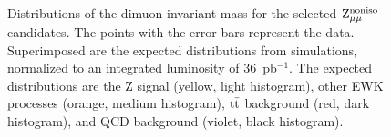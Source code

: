 \begin{figure}[hbtp]
    \begin{center}
     \begin{minipage}{73mm}
       \begin{center}
       \end{center}
     \end{minipage}
   \end{center}
\caption{Distributions of the dimuon invariant mass for the selected
$\mathrm{Z}_{\mu\mu}^{\mathrm{noniso}}$ candidates.
The points with the error bars represent the data.
Superimposed are the expected distributions from simulations, normalized
to an integrated luminosity of $36$~pb$^{-1}$. The expected distributions are
the Z signal (yellow, light histogram), other EWK processes (orange, medium histogram),
$\mathrm{t}\bar{\mathrm{t}}$ background (red, dark histogram), and QCD background (violet, black histogram).
}
\label{fig:zNoGold2}
\end{figure}

